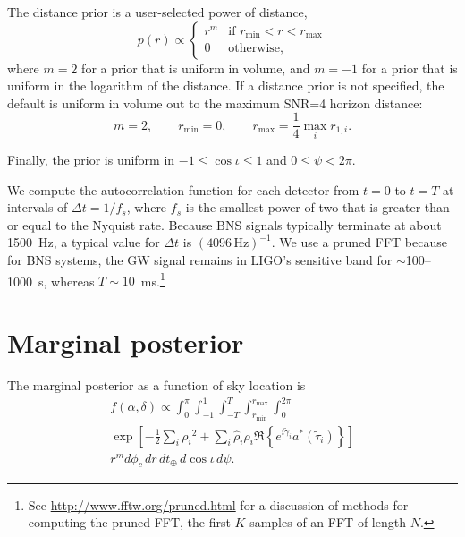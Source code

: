 \documentclass[amsmath,amssymb,aps,prx,reprint,nopreprintnumbers,nofootinbib]{revtex4-1}
\begin{document}
The distance prior is a user-selected power of distance,
%
\begin{equation*}
    p(r) \propto \begin{cases}
        r^m & \text{if } r_\mathrm{min} < r < r_\mathrm{max} \\
        0 & \text{otherwise},
    \end{cases}
\end{equation*}
%
where $m=2$ for a prior that is uniform in volume, and $m=-1$ for a prior that is uniform in the logarithm of the distance. If a distance prior is not specified, the default is uniform in volume out to the maximum SNR=4 horizon distance:
%
\begin{equation*}
    m = 2,
    \qquad
    r_\mathrm{min} = 0,
    \qquad
    r_\mathrm{max} = \frac{1}{4} \max_i r_{1,i}.
\end{equation*}

Finally, the prior is uniform in $-1 \leq \cos\iota \leq 1$ and $0 \leq \psi < 2\pi$.

We compute the autocorrelation function for each detector from $t = 0$ to $t = T$ at intervals of $\Delta t = 1/f_s$, where $f_s$ is the smallest power of two that is greater than or equal to the Nyquist rate. Because BNS signals typically terminate at about 1500~Hz, a typical value for $\Delta t$ is $(4096\,\textrm{Hz})^{-1}$. We use a pruned \ac{FFT} because for BNS systems, the \ac{GW} signal remains in LIGO's sensitive band for $\sim$100\nobreakdashes--1000~s, whereas $T \sim 10$~ms.\footnote{See \url{http://www.fftw.org/pruned.html} for a discussion of methods for computing the pruned \ac{FFT}, the first $K$ samples of an \ac{FFT} of length $N$.}

\section{Marginal posterior}
\label{sec:marginal-posterior}

The marginal posterior as a function of sky location is
%
\begin{multline}
    f(\alpha, \delta) \propto
    \int_{0}^{\pi}
    \int_{-1}^{1}
    \int_{-T}^{T}
    \int_{r_\mathrm{min}}^{r_\mathrm{max}}
    \int_{0}^{2\pi}
    \\
    \exp \left[ - \frac{1}{2} \sum_i {\rho_i}^2
        + \sum_i \hat\rho_i \rho_i \Re \left\{ e^{i \tilde{\gamma}_i}
        a^*(\tilde{\tau}_i)
        \right\}
    \right] \\
    r^m d\phi_c \, dr \, dt_\oplus \, d\cos{\iota} \, d\psi.
\end{multline}
\end{document}

